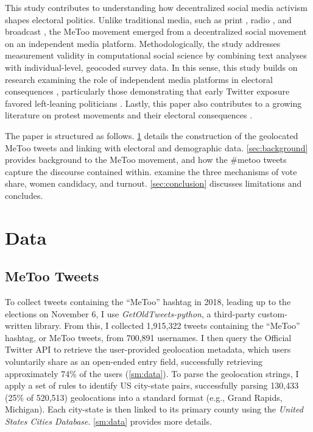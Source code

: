 \documentclass[manuscript,screen,nonacm,11pt,acm]{acmart}
\begin{document}
This study contributes to understanding how decentralized social media 
activism shapes electoral politics.
Unlike traditional media, such as print \citep{Lim2015}, radio \citep{AEP2015, Boas2011, Ferraz2008, Larreguy2014}, and broadcast \citep{DellaVigna2007, Oberholzer-Gee2009}, the MeToo movement emerged from a decentralized social movement on an independent media platform.
Methodologically, the study addresses measurement validity in computational social science by combining text analyses with individual-level, geocoded survey data.
In this sense, this study builds on research examining the role of independent media platforms in electoral consequences \citep{Enikolopov2011, cs, Miner2015}, particularly those demonstrating that early Twitter exposure favored left-leaning politicians \citep{cs}.
Lastly, this paper also contributes to a growing literature on protest movements and their electoral consequences \citep{Acemoglu2018, Campante2017, trumphate, kim2022, womenmarch, leon2022, trumpcomment, elitestweet, weiss2022}.

The paper is structured as follows.
\cref{sec:data} details the construction of the geolocated MeToo tweets and linking with electoral and demographic data.
\cref{sec:background} provides background to the MeToo movement, and how the \#metoo tweets capture the discourse contained within.
 examine the three mechanisms of vote share, women candidacy, and turnout.
\cref{sec:conclusion} discusses limitations and concludes.

\section{Data}
\label{sec:data}
\subsection{MeToo Tweets}
\label{sec:tweet-data}
To collect tweets containing the ``MeToo'' hashtag in 2018, leading up to the elections on November 6, I use \emph{GetOldTweets-python}, a third-party custom-written library.
From this, I collected 1,915,322 tweets containing the ``MeToo'' hashtag, or MeToo tweets, from 700,891 usernames. 
I then query the Official Twitter API to retrieve the user-provided geolocation metadata, which users voluntarily share as an open-ended entry field, successfully retrieving approximately 74\% of the users (\cref{sm:data}).
To parse the geolocation strings, I apply a set of rules to identify US city-state pairs, successfully parsing 130,433 (25\% of 520,513) geolocations into a standard format (e.g., Grand Rapids, Michigan).
Each city-state is then linked to its primary county using the \emph{United States Cities Database}.
\cref{sm:data} provides more details.
\end{document}
